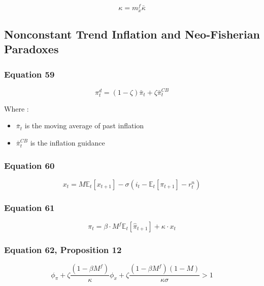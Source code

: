 \documentclass{article}
\begin{document}
\begin{equation}\tag{58}
    \kappa = m^{f}_{x}\bar{\kappa}
\end{equation}

\subsection{Nonconstant Trend Inflation and Neo-Fisherian Paradoxes}

\subsubsection*{Equation 59}

\begin{equation}\tag{59}
    \pi^{d}_{t}=(1-\zeta)\bar{\pi}_{t}+\zeta\bar{\pi}_{t}^{CB}
\end{equation}

Where : 
\begin{itemize}
    \item $\bar{\pi}_{t}$ is the moving average of past inflation 
    \item $\bar{\pi}_{t}^{CB}$ is the inflation guidance 
\end{itemize}

\subsubsection*{Equation 60}

\begin{equation}\tag{60}
    x_{t}=M\mathbb{E}_{t}\left[x_{t+1}\right]-\sigma\left(i_{t}-\mathbb{E}_{t}\left[\pi_{t+1}\right]-r^{n}_{t}\right)
\end{equation}

\subsubsection*{Equation 61}

\begin{equation}\tag{61}
    \pi_{t}=\beta\cdot M^{f} \mathbb{E}_t\left[\hat{\pi}_{t+1}\right]+\kappa\cdot x_{t}
\end{equation}

\subsubsection*{Equation 62, Proposition 12}

\begin{equation}\tag{62}
    \phi_{\pi}+\zeta \frac{(1-\beta M^{f})}{\kappa}\phi_{x}+\zeta\frac{(1-\beta M^{f})(1-M)}{\kappa \sigma}>1
\end{equation}
\end{document}
